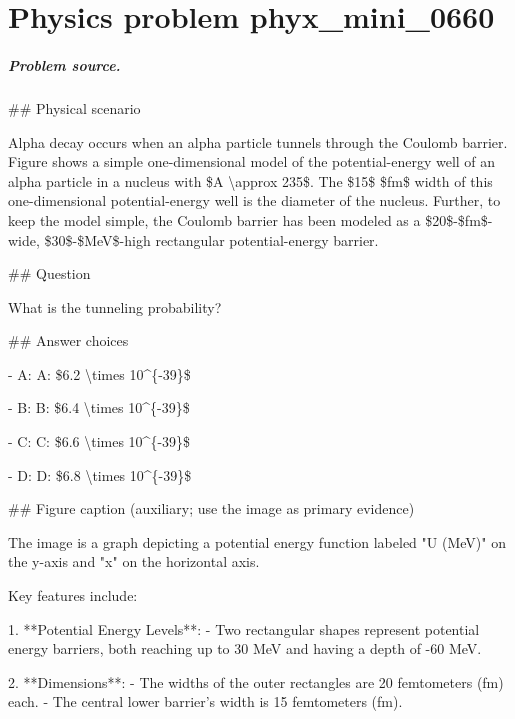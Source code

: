 
\chapter{Physics problem phyx\_mini\_0660}
\label{ch:PhyXMiniProblems_problem_phyx_mini_0660}

\paragraph{Problem source.}
\#\# Physical scenario

Alpha decay occurs when an alpha particle tunnels through the Coulomb barrier. Figure shows a simple one-dimensional model of the potential-energy well of an alpha particle in a nucleus with \$A \textbackslash{}approx 235\$. The \$15\$ \$fm\$ width of this one-dimensional potential-energy well is the diameter of the nucleus. Further, to keep the model simple, the Coulomb barrier has been modeled as a \$20\$-\$fm\$-wide, \$30\$-\$MeV\$-high rectangular potential-energy barrier.

\#\# Question

What is the tunneling probability?

\#\# Answer choices

- A: A: \$6.2 \textbackslash{}times 10\textasciicircum{}\{-39\}\$

- B: B: \$6.4 \textbackslash{}times 10\textasciicircum{}\{-39\}\$

- C: C: \$6.6 \textbackslash{}times 10\textasciicircum{}\{-39\}\$

- D: D: \$6.8 \textbackslash{}times 10\textasciicircum{}\{-39\}\$

\#\# Figure caption (auxiliary; use the image as primary evidence)

The image is a graph depicting a potential energy function labeled "U (MeV)" on the y-axis and "x" on the horizontal axis. 

Key features include:

1. **Potential Energy Levels**:
   - Two rectangular shapes represent potential energy barriers, both reaching up to 30 MeV and having a depth of -60 MeV.

2. **Dimensions**: 
   - The widths of the outer rectangles are 20 femtometers (fm) each.
   - The central lower barrier's width is 15 femtometers (fm).

